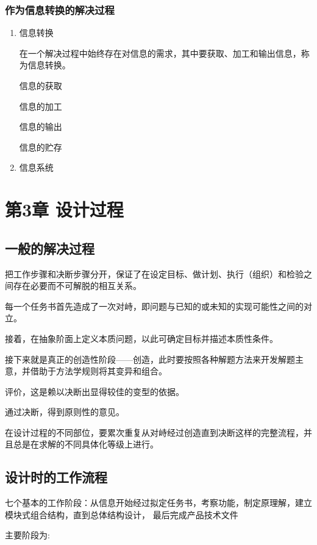 \documentclass[letterpaper,10pt,english]{sphinxmanual}
\begin{document}
\subsection{作为信息转换的解决过程}
\label{unit2:id12}\begin{enumerate}
\item {} 
信息转换

在一个解决过程中始终存在对信息的需求，其中要获取、加工和输出信息，称为信息转换。

信息的获取

信息的加工

信息的输出

信息的贮存

\item {} 
信息系统

\end{enumerate}


\chapter{第3章 设计过程}
\label{unit3::doc}\label{unit3:id1}

\section{一般的解决过程}
\label{unit3:id2}
把工作步骤和决断步骤分开，保证了在设定目标、做计划、执行（组织）和检验之间存在必要而不可解脱的相互关系。

每一个任务书首先造成了一次对峙，即问题与已知的或未知的实现可能性之间的对立。

接着，在抽象阶面上定义本质问题，以此可确定目标并描述本质性条件。

接下来就是真正的创造性阶段——创造，此时要按照各种解题方法来开发解题主意，并借助于方法学规则将其变异和组合。

评价，这是赖以决断出显得较佳的变型的依据。

通过决断，得到原则性的意见。

在设计过程的不同部位，要累次重复从对峙经过创造直到决断这样的完整流程，并且总是在求解的不同具体化等级上进行。


\section{设计时的工作流程}
\label{unit3:id3}
七个基本的工作阶段：从信息开始经过拟定任务书，考察功能，制定原理解，建立模块式组合结构，直到总体结构设计，
最后完成产品技术文件

主要阶段为:
\end{document}
